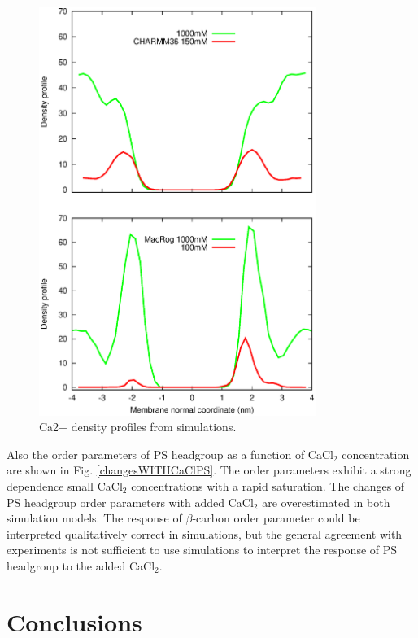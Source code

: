 \documentclass[aps,prl,superscriptaddress,twocolumn]{revtex4}
\begin{document}
\begin{figure}[]
  \centering
  \includegraphics[width=9cm]{../Figs/CAdensPCPSmixture.eps}
  \caption{\label{CAdensPCPSmixture}
    Ca2+ density profiles from simulations.
  }
\end{figure}


Also the order parameters of PS headgroup as a function of CaCl$_2$ concentration
are shown in Fig. \ref{changesWITHCaClPS}. The order parameters exhibit
a strong dependence small CaCl$_2$ concentrations with a rapid saturation. 
The changes of PS headgroup order parameters with added CaCl$_2$ are overestimated in
both simulation models. The response of $\beta$-carbon order parameter could be
interpreted qualitatively correct in simulations, but the general agreement with
experiments is not sufficient to use simulations to interpret the response of
PS headgroup to the added CaCl$_2$.


\section{Conclusions}
\end{document}
